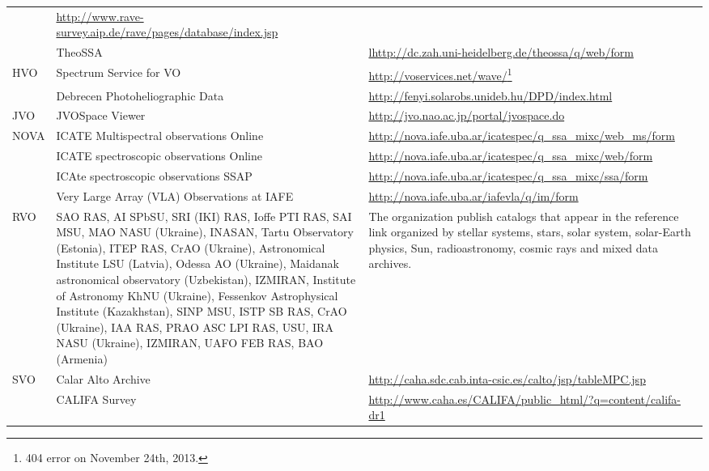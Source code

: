 \begin{longtable}{|m{2cm}|m{4.5cm}|m{7.5cm}|}
     & \url{http://www.rave-survey.aip.de/rave/pages/database/index.jsp} \\
     \cline{2-3}
     & TheoSSA
     & \url{lhttp://dc.zah.uni-heidelberg.de/theossa/q/web/form} \\
     \hline
    \multirow{2}{*}{HVO} & Spectrum Service for VO
    & \url{http://voservices.net/wave/}\footnote{404 error on November 24th,
                                                 2013.} \\
    \cline{2-3}
     & Debrecen Photoheliographic Data
     & \url{http://fenyi.solarobs.unideb.hu/DPD/index.html} \\
     \hline
    JVO & JVOSpace Viewer
    & \url{http://jvo.nao.ac.jp/portal/jvospace.do} \\
    \hline
    \multirow{4}{*}{NOVA} & ICATE Multispectral observations Online 
    & \url{http://nova.iafe.uba.ar/icatespec/q_ssa_mixc/web_ms/form} \\
    \cline{2-3}
     & ICATE spectroscopic observations Online
     & \url{http://nova.iafe.uba.ar/icatespec/q_ssa_mixc/web/form} \\
     \cline{2-3}
     & ICAte spectroscopic observations SSAP
     & \url{http://nova.iafe.uba.ar/icatespec/q_ssa_mixc/ssa/form} \\
     \cline{2-3}
     & Very Large Array (VLA) Observations at IAFE 
     & \url{http://nova.iafe.uba.ar/iafevla/q/im/form} \\
     \hline
   RVO \cite{website:rvo-resources} & SAO RAS, AI SPbSU, SRI (IKI) RAS, Ioffe
   PTI RAS, SAI MSU, MAO NASU (Ukraine), INASAN, Tartu Observatory (Estonia),
   ITEP RAS, CrAO (Ukraine), Astronomical Institute LSU (Latvia), Odessa AO
   (Ukraine), Maidanak astronomical observatory (Uzbekistan), IZMIRAN, Institute
   of Astronomy KhNU (Ukraine), Fessenkov Astrophysical Institute (Kazakhstan),
   SINP MSU, ISTP SB RAS, CrAO (Ukraine), IAA RAS, PRAO ASC LPI RAS, USU, IRA
   NASU (Ukraine), IZMIRAN, UAFO FEB RAS, BAO (Armenia) & The organization
   publish catalogs that appear in the reference link organized by stellar
   systems, stars, solar system, solar-Earth physics, Sun, radioastronomy,
   cosmic rays and mixed data archives. \\
   \hline
   \multirow{14}{*}{SVO} & Calar Alto Archive
   & \url{http://caha.sdc.cab.inta-csic.es/calto/jsp/tableMPC.jsp} \\
   \cline{2-3}
    & CALIFA Survey
    & \url{http://www.caha.es/CALIFA/public_html/?q=content/califa-dr1} \\
    \cline{2-3}

\end{longtable}
